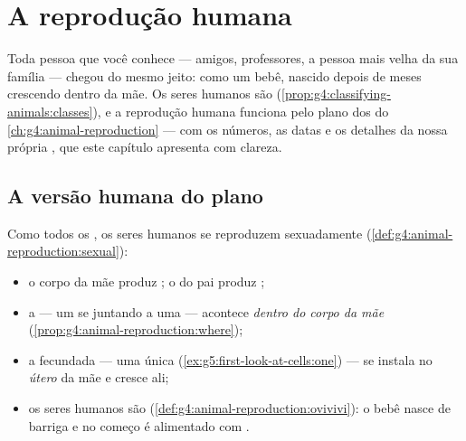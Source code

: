 \chapter{A reprodução humana}\label{ch:g5:human-reproduction}

Toda pessoa que você conhece --- amigos, professores, a pessoa mais
velha da sua família --- chegou do mesmo jeito: como um bebê, nascido
depois de meses crescendo dentro da mãe. Os seres humanos são
 (\cref{prop:g4:classifying-animals:classes}), e a
reprodução humana funciona pelo plano dos  do
\cref{ch:g4:animal-reproduction} --- com os números, as datas e os
detalhes da nossa própria , que este capítulo apresenta com
clareza.

\section{A versão humana do plano}

\begin{proposition}\label{prop:g5:human-reproduction:plan}
Como todos os , os seres humanos se reproduzem sexuadamente
(\cref{def:g4:animal-reproduction:sexual}):
\begin{itemize}
  \item o corpo da mãe produz \emph{};
        o do pai produz \emph{};
  \item a  --- um  se juntando a uma  --- acontece \emph{dentro do corpo da
        mãe} (\cref{prop:g4:animal-reproduction:where});
  \item a  fecundada --- uma única 
        (\cref{ex:g5:first-look-at-cells:one}) --- se instala no
        \emph{útero} da mãe e cresce ali;
  \item os seres humanos são 
        (\cref{def:g4:animal-reproduction:ovivivi}): o bebê nasce de
        barriga e no começo é alimentado com .
\end{itemize}
\end{proposition}
\admitted

